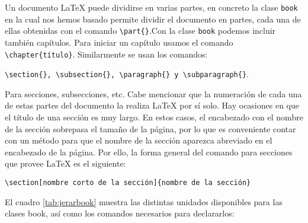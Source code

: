 Un documento \LaTeX{} puede dividirse en varias partes, en concreto la clase \verb|book| en la cual nos hemos basado permite dividir el documento en partes, cada una de ellas obtenidas con el comando \verb|\part{}|.Con la clase \verb|book| podemos incluir también capítulos. Para iniciar un capítulo usamos el comando \verb|\chapter{título}|.
Similarmente se usan los comandos:

\verb|\section{}, \subsection{}, \paragraph{} y \subparagraph{}|.

Para secciones, subsecciones, etc. Cabe mencionar que la numeración de cada una de estas partes del documento la realiza \LaTeX{} por sí solo.
Hay ocasiones en que el título de una sección es muy largo. En estos casos, el encabezado con el nombre de la sección sobrepasa el tamaño de la página, por lo que es conveniente contar con un método para que el nombre de la sección aparezca abreviado en el encabezado de la página. Por ello, la forma general del comando para secciones que provee \LaTeX{} es el siguiente:

\verb|\section[nombre corto de la sección]{nombre de la sección}|

El cuadro \ref{tab:jerarbook} muestra las distintas unidades disponibles para las clases book, así como los comandos necesarios para declararlos:

